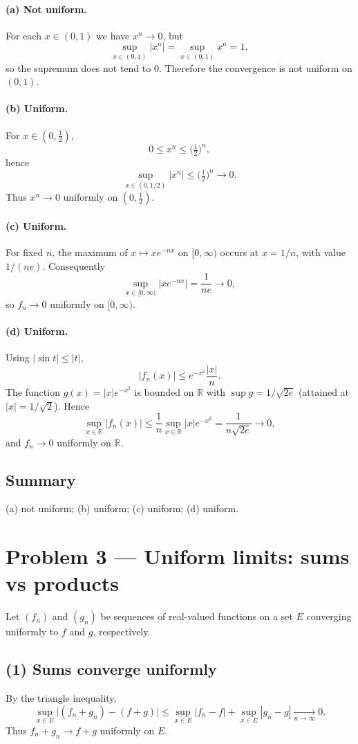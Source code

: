 \documentclass[12pt,a4paper]{article}
\theoremstyle{plain}
\theoremstyle{definition}
\theoremstyle{remark}
\theoremstyle{remark}
\begin{document}
\paragraph{(a) Not uniform.}
For each $x\in(0,1)$ we have $x^n\to0$, but
\[
\sup_{x\in(0,1)} |x^n|=\sup_{x\in(0,1)} x^n=1,
\]
so the supremum does not tend to $0$. Therefore the convergence is not uniform on $(0,1)$.

\paragraph{(b) Uniform.}
For $x\in(0,\tfrac12)$,
\[
0\le x^n\le \Big(\tfrac12\Big)^n,
\]
hence
\[
\sup_{x\in(0,1/2)}|x^n|\le \Big(\tfrac12\Big)^n\to0.
\]
Thus $x^n\to0$ uniformly on $(0,\tfrac12)$.

\paragraph{(c) Uniform.}
For fixed $n$, the maximum of $x\mapsto x e^{-n x}$ on $[0,\infty)$ occurs at $x=1/n$, with value $1/(n e)$. Consequently
\[
\sup_{x\in[0,\infty)} |x e^{-n x}|=\frac{1}{n e}\to0,
\]
so $f_n\to0$ uniformly on $[0,\infty)$.

\paragraph{(d) Uniform.}
Using $|\sin t|\le |t|$,
\[
|f_n(x)|\le e^{-x^2}\frac{|x|}{n}.
\]
The function $g(x)=|x|e^{-x^2}$ is bounded on $\mathbb{R}$ with $\sup g=1/\sqrt{2e}$ (attained at $|x|=1/\sqrt2$). Hence
\[
\sup_{x\in\mathbb{R}} |f_n(x)|
\le \frac{1}{n}\sup_{x\in\mathbb{R}} |x|e^{-x^2}
= \frac{1}{n\sqrt{2e}}\to0,
\]
and $f_n\to0$ uniformly on $\mathbb{R}$.

\subsection*{Summary}
(a) not uniform; (b) uniform; (c) uniform; (d) uniform.


\section*{Problem 3 — Uniform limits: sums vs products}

Let $(f_n)$ and $(g_n)$ be sequences of real-valued functions on a set $E$ converging uniformly to $f$ and $g$, respectively.

\subsection*{(1) Sums converge uniformly}
By the triangle inequality,
\[
\sup_{x\in E}\big|(f_n+g_n)-(f+g)\big|
\le \sup_{x\in E}|f_n-f|+\sup_{x\in E}|g_n-g|\xrightarrow[n\to\infty]{}0.
\]
Thus $f_n+g_n\to f+g$ uniformly on $E$.
\end{document}
